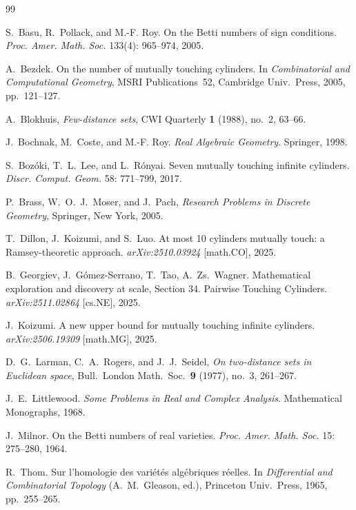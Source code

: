 \documentclass[letterpaper, reqno, 11pt]{article}
\numberwithin{equation}{section}
\theoremstyle{remark}
\begin{document}
\begin{thebibliography}{99}


S.~Basu, R.~Pollack, and M.-F. Roy. On the Betti numbers of sign conditions. \emph{Proc. Amer. Math. Soc.} 133(4): 965--974, 2005.

A.~Bezdek. On the number of mutually touching cylinders. In \emph{Combinatorial and Computational Geometry},
MSRI Publications~52, Cambridge Univ.\ Press, 2005, pp.~121--127.

A.~Blokhuis,
\emph{Few-distance sets},
CWI Quarterly \textbf{1} (1988), no.~2, 63--66.


J.~Bochnak, M.~Coste, and M.-F. Roy. \emph{Real Algebraic Geometry}. Springer, 1998.

S.~Boz\'oki, T.~L.~Lee, and L.~R\'onyai. Seven mutually touching infinite cylinders. \emph{Discr. Comput. Geom.} 58: 771--799, 2017.

P.~Brass, W.~O.~J.~Moser, and J.~Pach,
\emph{Research Problems in Discrete Geometry},
Springer, New York, 2005. 


T.~Dillon, J.~Koizumi, and S.~Luo. At most 10 cylinders mutually touch: a Ramsey-theoretic approach. \emph{arXiv:2510.03924} [math.CO], 2025.

B.~Georgiev, J.~Gómez-Serrano, T.~Tao, A.~Zs.~Wagner. Mathematical exploration and discovery at scale, Section 34. Pairwise Touching Cylinders.
\emph{arXiv:2511.02864} [cs.NE], 2025.

J.~Koizumi. A new upper bound for mutually touching infinite cylinders. \emph{arXiv:2506.19309} [math.MG], 2025.

D.~G.~Larman, C.~A.~Rogers, and J.~J.~Seidel,
\emph{On two-distance sets in Euclidean space},
Bull.\ London Math.\ Soc.\ \textbf{9} (1977), no.~3, 261--267.

J.~E.~Littlewood. \emph{Some Problems in Real and Complex Analysis}. Mathematical Monographs, 1968.






J.~Milnor. On the Betti numbers of real varieties. \emph{Proc. Amer. Math. Soc.} 15: 275--280, 1964.


R.~Thom. Sur l'homologie des vari\'et\'es alg\'ebriques r\'eelles. In \emph{Differential and Combinatorial Topology} (A.~M.~Gleason, ed.),
Princeton Univ.\ Press, 1965, pp.~255--265.




\end{thebibliography}
\end{document}
